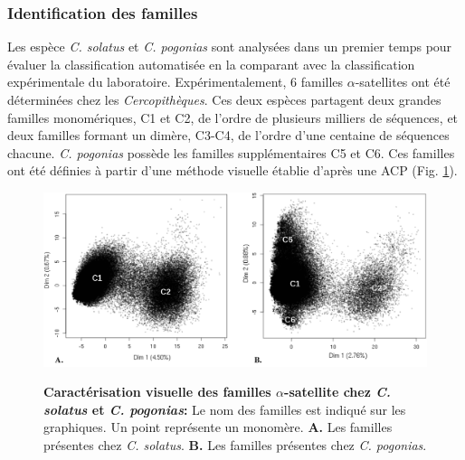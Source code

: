 \documentclass[12pt,a4paper]{article}
\begin{document}
			\subsubsection{Identification des familles}
			Les espèce \textit{C. solatus} et \textit{C. pogonias} sont analysées dans un premier temps pour évaluer la classification automatisée en la comparant avec la classification expérimentale du laboratoire. Expérimentalement, 6 familles $\alpha$-satellites ont été déterminées chez les \textit{Cercopithèques}. Ces deux espèces partagent deux grandes familles monomériques, C1 et C2, de l'ordre de plusieurs milliers de séquences, et deux familles formant un dimère, C3-C4, de l'ordre d'une centaine de séquences chacune. \textit{C. pogonias} possède les familles supplémentaires C5 et C6. Ces familles ont été définies à partir d'une méthode visuelle établie d'après une ACP (Fig. \ref{fig:ACP_exp}).\\
	\begin{figure}	
		\includegraphics[scale=0.4]{img/ACP_experimental.png}  \\
		\caption{\textbf{Caractérisation visuelle des familles $\alpha$-satellite chez \textit{C. solatus} et \textit{C. pogonias}:}\label{fig:ACP_exp}
		Le nom des familles est indiqué sur les graphiques. Un point représente un monomère. \textbf{A.} Les familles présentes chez \textit{C. solatus}. \textbf{B.} Les familles présentes chez \textit{C. pogonias}.} 
	\end{figure}
	
\end{document}
